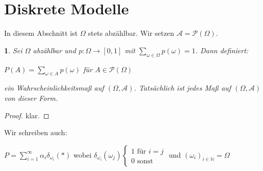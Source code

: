 \documentclass[10pt,a4paper]{report}
\numberwithin{equation}{section}
\numberwithin{figure}{section}
\theoremstyle{plain}
\theoremstyle{definition}
\theoremstyle{remark}
\theoremstyle{plain}
\newtheorem{prop}[thm]{\protect\propositionname}
\providecommand{\propositionname}{Satz}
\newcommand{\1}{ \mathbb{1} } %
\begin{document}
\section{Diskrete Modelle}
\label{sec:diskrete-modelle}

In diesem Abschnitt ist $\Omega$ stets abzählbar. Wir setzen $\mathcal{A}=\mathcal{P}(\Omega)$.
\begin{prop}  %
  Sei $\Omega$ abzählbar und $p: \Omega \to [0,1]$ mit
  $\sum\limits_{\omega \in \Omega}p(\omega)=1$. Dann definiert:
  \begin{center}
    $P(A)=\sum\limits_{\omega \in A} p(\omega)$ für $A\in
    \mathcal{P}(\Omega)$
  \end{center}
  ein Wahrscheinlichkeitsmaß auf $(\Omega,\mathcal{A})$. Tatsächlich ist jedes Maß auf
  $(\Omega,\mathcal{A})$ von dieser Form.
\end{prop}
\begin{proof}
  klar.
\end{proof}
Wir schreiben auch:
\begin{center}
  $P=\sum\limits_{i=1}^\infty \alpha_i\delta_{\omega_i}(*)$ wobei
  $\delta_{\omega_i}(\omega_j)
  \begin{cases}
    1 \text{ für } i=j\\
    0 \text{ sonst}
  \end{cases}$ und $(\omega_i)_{i \in \mathbb{N}}=\Omega$
\end{center}
\end{document}
